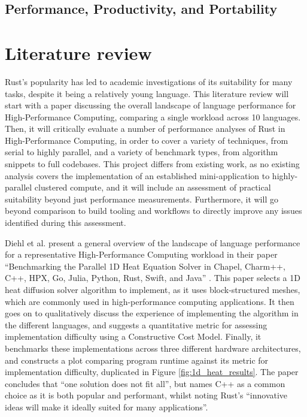 \subsection{Performance, Productivity, and Portability}
\label{ssec:p3hpc} %




\section{Literature review} %
\label{sec:literature-review}

Rust's popularity has led to academic investigations of its suitability for many tasks, despite it being a relatively young language. This literature review will start with a paper discussing the overall landscape of language performance for High-Performance Computing, comparing a single workload across 10 languages. Then, it will critically evaluate a number of performance analyses of Rust in High-Performance Computing, in order to cover a variety of techniques, from serial to highly parallel, and a variety of benchmark types, from algorithm snippets to full codebases. This project differs from existing work, as no existing analysis covers the implementation of an established mini-application to highly-parallel clustered compute, and it will include an assessment of practical suitability beyond just performance measurements. Furthermore, it will go beyond comparison to build tooling and workflows to directly improve any issues identified during this assessment.

Diehl et al. present a general overview of the landscape of language performance for a representative High-Performance Computing workload in their paper ``Benchmarking the Parallel 1D Heat Equation Solver in Chapel, Charm++, C++, HPX, Go, Julia, Python, Rust, Swift, and Java'' \cite{diehlBenchmarkingParallel1D2023}. This paper selects a 1D heat diffusion solver algorithm to implement, as it uses block-structured meshes, which are commonly used in high-performance computing applications. It then goes on to qualitatively discuss the experience of implementing the algorithm in the different languages, and suggests a quantitative metric for assessing implementation difficulty using a Constructive Cost Model. Finally, it benchmarks these implementations across three different hardware architectures, and constructs a plot comparing program runtime against its metric for implementation difficulty, duplicated in Figure \ref{fig:1d_heat_results}. The paper concludes that ``one solution does not fit all'', but names C++ as a common choice as it is both popular and performant, whilst noting Rust's ``innovative ideas will make it ideally suited for many applications''.

